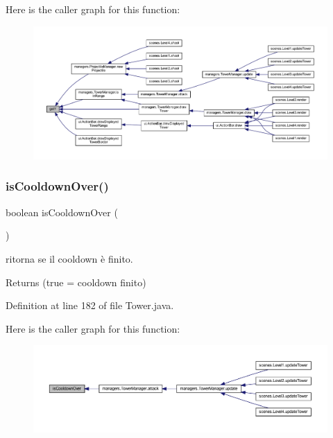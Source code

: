 Here is the caller graph for this function\+:
\nopagebreak
\begin{figure}[H]
\begin{center}
\leavevmode
\includegraphics[width=350pt]{classtowers_1_1_tower_aab81944f0a14bba932c0931899951937_icgraph}
\end{center}
\end{figure}
\mbox{\label{classtowers_1_1_tower_a2c29881b5a93fb867aea578992af0db1}} 
\subsubsection{\texorpdfstring{is\+Cooldown\+Over()}{isCooldownOver()}}
{\footnotesize\ttfamily boolean is\+Cooldown\+Over (\begin{DoxyParamCaption}{ }\end{DoxyParamCaption})}



ritorna se il cooldown è finito. 

\begin{DoxyReturn}{Returns}
(true = cooldown finito) 
\end{DoxyReturn}


Definition at line 182 of file Tower.\+java.

Here is the caller graph for this function\+:
\nopagebreak
\begin{figure}[H]
\begin{center}
\leavevmode
\includegraphics[width=350pt]{classtowers_1_1_tower_a2c29881b5a93fb867aea578992af0db1_icgraph}
\end{center}
\end{figure}
\mbox{\label{classtowers_1_1_tower_ac235927565a120a3157ef902721c105e}} 
